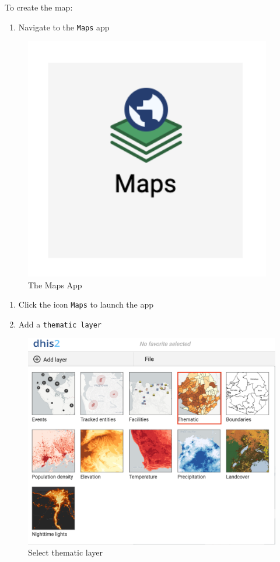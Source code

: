 \documentclass[]{book}
\providecommand{\tightlist}{%
  \setlength{\itemsep}{0pt}\setlength{\parskip}{0pt}}
\begin{document}
To create the map:

\begin{enumerate}
\def\labelenumi{\arabic{enumi}.}
\tightlist
\item
  Navigate to the \texttt{Maps} app
\end{enumerate}

\begin{figure}
\includegraphics[width=4.25in]{./images/map} \caption{The Maps App}\label{fig:map}
\end{figure}

\begin{enumerate}
\def\labelenumi{\arabic{enumi}.}
\setcounter{enumi}{1}
\tightlist
\item
  Click the icon \texttt{Maps} to launch the app
\item
  Add a \texttt{thematic\ layer}
\end{enumerate}

\begin{figure}
\includegraphics[width=19.25in]{./images/maps1} \caption{Select thematic layer}\label{fig:maps1}
\end{figure}
\end{document}

